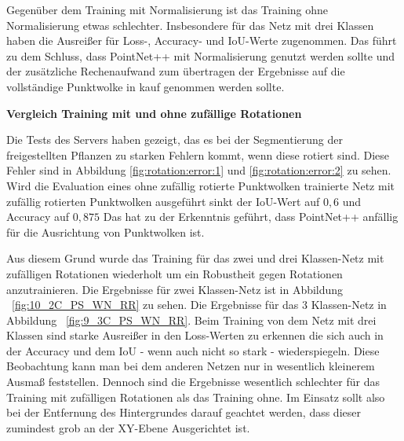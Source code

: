 \documentclass[12pt,titlepage, twoside]{article}
\begin{document}
Gegenüber dem Training mit Normalisierung ist das Training ohne Normalisierung etwas schlechter. Insbesondere für das Netz mit drei Klassen haben die Ausreißer für Loss-, Accuracy- und IoU-Werte zugenommen.
Das führt zu dem Schluss, dass PointNet++ mit Normalisierung genutzt werden sollte und der zusätzliche Rechenaufwand zum übertragen der Ergebnisse auf die vollständige Punktwolke in kauf genommen werden sollte.

\textbf{Vergleich Training mit und ohne zufällige Rotationen}

Die Tests des Servers haben gezeigt, das es bei der Segmentierung der freigestellten Pflanzen zu starken Fehlern kommt, wenn diese rotiert sind. Diese Fehler sind in Abbildung \ref{fig:rotation:error:1} und \ref{fig:rotation:error:2} zu sehen.
Wird die Evaluation eines ohne zufällig rotierte Punktwolken trainierte Netz mit zufällig rotierten Punktwolken ausgeführt sinkt der IoU-Wert auf $0,6$ und Accuracy auf $0,875$
Das hat zu der Erkenntnis geführt, dass PointNet++ anfällig für die Ausrichtung von Punktwolken ist. 

Aus diesem Grund wurde das Training für das zwei und drei Klassen-Netz mit zufälligen Rotationen wiederholt um ein Robustheit gegen Rotationen anzutrainieren.
Die Ergebnisse für zwei Klassen-Netz ist in Abbildung ~\ref{fig:10_2C_PS_WN_RR} zu sehen. Die Ergebnisse für das 3 Klassen-Netz in Abbildung ~\ref{fig:9_3C_PS_WN_RR}. 
Beim Training von dem Netz mit drei Klassen sind starke Ausreißer in den Loss-Werten zu erkennen die sich auch in der Accuracy und dem IoU - wenn auch nicht so stark - wiederspiegeln.
Diese Beobachtung kann man bei dem anderen Netzen nur in wesentlich kleinerem Ausmaß feststellen. Dennoch sind die Ergebnisse wesentlich schlechter für das Training mit zufälligen Rotationen als das Training ohne.
Im Einsatz sollt also bei der Entfernung des Hintergrundes darauf geachtet werden, dass dieser zumindest grob an der XY-Ebene Ausgerichtet ist.
\end{document}
